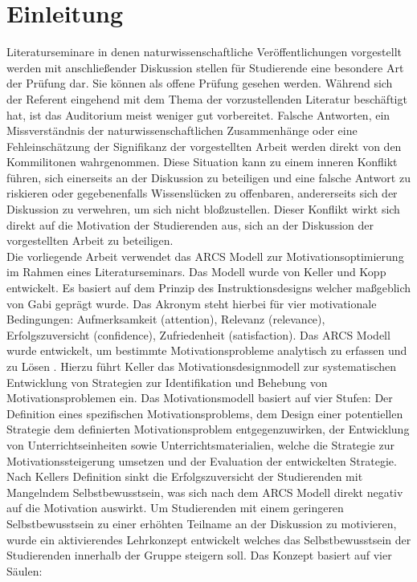 \section{Einleitung}
Literaturseminare in denen naturwissenschaftliche Veröffentlichungen vorgestellt werden mit anschließender Diskussion stellen für Studierende eine besondere Art der Prüfung dar. Sie können als offene Prüfung gesehen werden. Während sich der Referent eingehend mit dem Thema der vorzustellenden Literatur beschäftigt hat, ist das Auditorium meist weniger gut vorbereitet. Falsche Antworten, ein Missverständnis der naturwissenschaftlichen Zusammenhänge oder eine
Fehleinschätzung der Signifikanz der vorgestellten Arbeit werden direkt von den Kommilitonen wahrgenommen. Diese Situation kann zu einem inneren Konflikt führen, sich einerseits an der Diskussion zu beteiligen und eine falsche Antwort zu riskieren oder gegebenenfalls Wissenslücken zu offenbaren, andererseits sich der Diskussion zu verwehren, um sich nicht bloßzustellen. Dieser Konflikt wirkt sich direkt auf die Motivation der Studierenden aus, sich an der Diskussion der vorgestellten Arbeit zu beteiligen.\\
\noindent
Die vorliegende Arbeit verwendet das ARCS Modell zur Motivationsoptimierung im Rahmen eines Literaturseminars. Das Modell wurde von Keller und Kopp \cite{Kopp.1987} entwickelt. Es basiert auf dem Prinzip des Instruktionsdesigns welcher maßgeblich von Gabi geprägt wurde. Das Akronym steht hierbei für vier motivationale Bedingungen: Aufmerksamkeit (attention), Relevanz (relevance), Erfolgszuversicht (confidence), Zufriedenheit (satisfaction). Das ARCS Modell wurde entwickelt, um bestimmte Motivationsprobleme analytisch zu erfassen und zu Lösen \cite{Keller.1987}. Hierzu führt Keller das Motivationsdesignmodell zur systematischen Entwicklung von Strategien zur Identifikation und Behebung von Motivationsproblemen ein. Das Motivationsmodell basiert auf vier Stufen: Der Definition eines spezifischen Motivationsproblems, dem Design einer potentiellen Strategie dem definierten Motivationsproblem entgegenzuwirken, der Entwicklung von Unterrichtseinheiten sowie Unterrichtsmaterialien, welche die Strategie zur Motivationssteigerung umsetzen und der Evaluation der entwickelten Strategie.\\
\noindent
Nach Kellers Definition sinkt die Erfolgszuversicht der Studierenden mit Mangelndem Selbstbewusstsein, was sich nach dem ARCS Modell direkt negativ auf die Motivation auswirkt. Um Studierenden mit einem geringeren Selbstbewusstsein zu einer erhöhten Teilname an der Diskussion zu motivieren, wurde ein aktivierendes Lehrkonzept entwickelt welches das Selbstbewusstsein der Studierenden innerhalb der Gruppe steigern soll. Das Konzept basiert auf vier Säulen:
